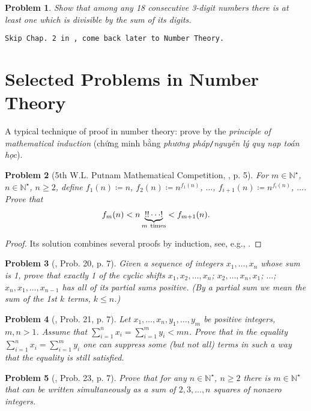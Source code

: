 \documentclass[oneside]{book}
\numberwithin{equation}{section}
\newtheorem{problem}{Problem}[section]
\begin{document}
\begin{problem}
	Show that among any 18 consecutive 3-digit numbers there is at least one which is divisible by the sum of its digits.
\end{problem}
\texttt{Skip Chap. 2 in \cite{Tao2006}, come back later to Number Theory.}

\section{Selected Problems in Number Theory}
A typical technique of proof in number theory: prove by the \textit{principle of mathematical induction} (chứng minh bằng \textit{phương pháp}\texttt{/}\textit{nguyên lý quy nạp toán học}).

\begin{problem}[5th W.L. Putnam Mathematical Competition, \cite{Gelca_Andreescu2017}, p. 5]
	For $m\in\mathbb{N}^\star$, $n\in\mathbb{N}^\star$, $n\ge 2$, define $f_1(n)\coloneqq n$, $f_2(n)\coloneqq n^{f_1(n)}$, $\ldots$, $f_{i+1}(n)\coloneqq n^{f_i(n)}$, $\ldots$. Prove that
	\begin{align*}
		f_m(n) < n\underbrace{!!\cdots!}_{m\ {\rm times}} < f_{m+1}(n).
	\end{align*}
\end{problem}

\begin{proof}[Proof]
	Its solution combines several proofs by induction, see, e.g., \cite[pp. 5--6]{Gelca_Andreescu2017}.
\end{proof}

\begin{problem}[\cite{Gelca_Andreescu2017}, Prob. 20, p. 7]
	Given a sequence of integers $x_1,\ldots,x_n$ whose sum is 1, prove that exactly 1 of the cyclic shifts $x_1,x_2,\ldots,x_n$; $x_2,\ldots,x_n,x_1$; $\ldots$; $x_n,x_1,\ldots,x_{n-1}$ has all of its partial sums positive. (By a \emph{partial sum} we mean the sum of the 1st $k$ terms, $k\le n$.)
\end{problem}

\begin{problem}[\cite{Gelca_Andreescu2017}, Prob. 21, p. 7]
	Let $x_1,\ldots,x_n,y_1,\ldots,y_m$ be positive integers, $m,n > 1$. Assume that $\sum_{i=1}^n x_i = \sum_{i=1}^m y_i < mn$. Prove that in the equality $\sum_{i=1}^n x_i = \sum_{i=1}^m y_i$ one can suppress some (but not all) terms in such a way that the equality is still satisfied.
\end{problem}

\begin{problem}[\cite{Gelca_Andreescu2017}, Prob. 23, p. 7]
	Prove that for any $n\in\mathbb{N}^\star$, $n\ge 2$ there is $m\in\mathbb{N}^\star$ that can be written simultaneously as a sum of $2,3,\ldots,n$ squares of nonzero integers.
\end{problem}
\end{document}
